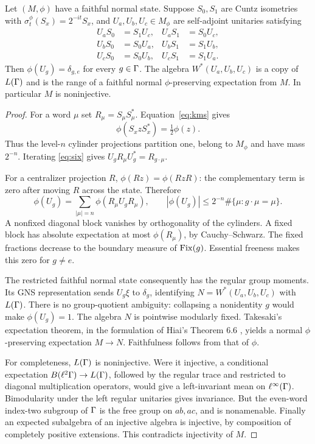 \begin{theorem}\label{thm:A}
Let $(M,\phi)$ have a faithful normal state. Suppose $S_0,S_1$ are Cuntz isometries with $\sigma_t^\phi(S_x)=2^{-it}S_x$, and $U_a,U_b,U_c\in M_\phi$ are self-adjoint unitaries satisfying
\begin{equation}\label{eq:six}
\begin{aligned}
 U_aS_0&=S_1U_c,& U_aS_1&=S_0U_c,\\
 U_bS_0&=S_0U_a,& U_bS_1&=S_1U_b,\\
 U_cS_0&=S_0U_b,& U_cS_1&=S_1U_a.
\end{aligned}
\end{equation}
Then $\phi(U_g)=\delta_{g,e}$ for every $g\in\Gamma$. The algebra $W^*(U_a,U_b,U_c)$ is a copy of $L(\Gamma)$ and is the range of a faithful normal $\phi$-preserving expectation from $M$. In particular $M$ is noninjective.
\end{theorem}
\begin{proof}
For a word $\mu$ set $R_\mu=S_\mu S_\mu^*$. Equation~\eqref{eq:kms} gives
\[
 \phi(S_xzS_x^*)=\tfrac12\phi(z).
\]
Thus the level-$n$ cylinder projections partition one, belong to $M_\phi$ and have mass $2^{-n}$. Iterating \eqref{eq:six} gives $U_gR_\mu U_g^*=R_{g\cdot\mu}$.

For a centralizer projection $R$, $\phi(Rz)=\phi(RzR)$: the complementary term is zero after moving $R$ across the state. Therefore
\[
 \phi(U_g)=\sum_{|\mu|=n}\phi(R_\mu U_gR_\mu),\qquad
 |\phi(U_g)|\le 2^{-n}\#\{\mu:g\cdot\mu=\mu\}.
\]
A nonfixed diagonal block vanishes by orthogonality of the cylinders. A fixed block has absolute expectation at most $\phi(R_\mu)$, by Cauchy--Schwarz. The fixed fractions decrease to the boundary measure of $\operatorname{Fix}(g)$. Essential freeness makes this zero for $g\ne e$.

The restricted faithful normal state consequently has the regular group moments. Its GNS representation sends $U_g\xi$ to $\delta_g$, identifying $N=W^*(U_a,U_b,U_c)$ with $L(\Gamma)$. There is no group-quotient ambiguity: collapsing a nonidentity $g$ would make $\phi(U_g)=1$. The algebra $N$ is pointwise modularly fixed. Takesaki's expectation theorem, in the formulation of Hiai's Theorem 6.6 \cite{Takesaki,Hiai}, yields a normal $\phi$-preserving expectation $M\to N$. Faithfulness follows from that of $\phi$.

For completeness, $L(\Gamma)$ is noninjective. Were it injective, a conditional expectation $B(\ell^2\Gamma)\to L(\Gamma)$, followed by the regular trace and restricted to diagonal multiplication operators, would give a left-invariant mean on $\ell^\infty(\Gamma)$. Bimodularity under the left regular unitaries gives invariance. But the even-word index-two subgroup of $\Gamma$ is the free group on $ab,ac$, and is nonamenable. Finally an expected subalgebra of an injective algebra is injective, by composition of completely positive extensions. This contradicts injectivity of $M$.
\end{proof}

